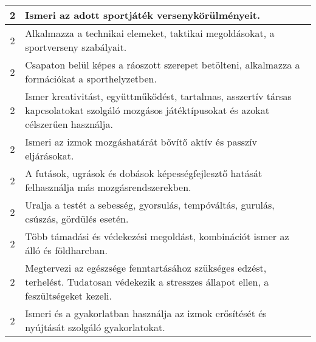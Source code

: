 \begin{longtable}{c | p{12cm} }
                                
                                          2 &  Ismeri az adott sportjáték versenykörülményeit. \\ \hline
                                          2 &  Alkalmazza a technikai elemeket, taktikai megoldásokat, a sportverseny szabályait. \\ \hline
                                          2 &  Csapaton belül képes a ráoszott szerepet betölteni, alkalmazza a formációkat a sporthelyzetben. \\ \hline
                                          2 &  Ismer kreativitást, együttműködést, tartalmas, asszertív társas kapcsolatokat szolgáló mozgásos játéktípusokat és azokat célszerűen használja. \\ \hline
                                          2 &  Ismeri az izmok mozgáshatárát bővítő aktív és passzív eljárásokat. \\ \hline
                                          2 &  A futások, ugrások és dobások képességfejlesztő hatását felhasználja más mozgásrendszerekben. \\ \hline
                                          2 &  Uralja a testét a sebesség, gyorsulás, tempóváltás, gurulás, csúszás, gördülés esetén. \\ \hline
                                          2 &  Több támadási és védekezési megoldást, kombinációt ismer az álló és földharcban. \\ \hline
                                          2 &  Megtervezi az egészsége fenntartásához szükséges edzést, terhelést. Tudatosan védekezik a stresszes állapot ellen, a feszültségeket kezeli. \\ \hline
                                          2 &  Ismeri és a gyakorlatban használja az izmok erősítését és nyújtását szolgáló gyakorlatokat. \\ \hline
                                      

\end{longtable}
